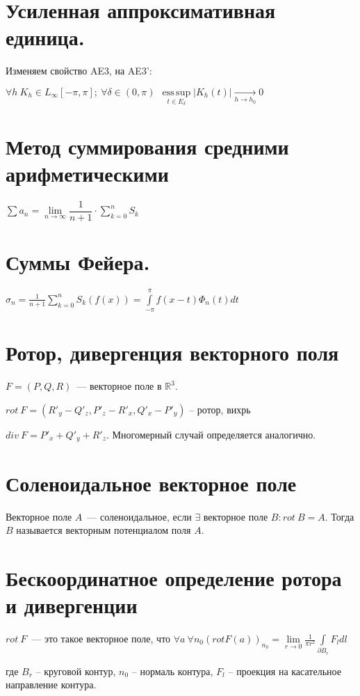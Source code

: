 \documentclass[paper=a4, fontsize=14pt]{report}
\DeclareMathOperator*{\esssup}{ess\, sup}
\begin{document}
    \section{Усиленная аппроксимативная единица.}
        
        Изменяем свойство AE3, на AE3': 
        
        $ \forall h ~ K_h \in L_\infty[-\pi, \pi]; ~ \forall \delta \in (0, \pi) ~ ~ \esssup\limits_{t \in E_\delta} |K_h(t)| \underset{h \rightarrow h_0}{\rightarrow} 0 $
        
    \section{Метод суммирования средними арифметическими}
        $\sum a_n = \lim\limits_{n \to \infty} \dfrac{1}{n+1} \cdot \sum\limits_{k=0}^n S_k$
    \section{Суммы Фейера.}
        $ \sigma_n = \frac{1}{n + 1} \sum\limits_{k=0}^{n} S_k(f(x)) = \int\limits_{-\pi}^{\pi} f(x - t) \Phi_n(t) dt$

	\section{Ротор, дивергенция векторного поля}
    $F = (P, Q, R)$~--- векторное поле в $\mathds{R}^3$.

	$ rot\ F = (R'_y - Q'_z, P'_z - R'_x, Q'_x - P'_y) $ -- ротор, вихрь

	$div\ F = P'_x + Q'_y + R'_z$. Многомерный случай определяется аналогично.

	\section{Соленоидальное векторное поле}
	Векторное поле $A$~--- соленоидальное, если $\exists$ векторное поле $B: rot\ B = A$. Тогда $B$ называется векторным потенциалом поля $A$.

	\section{Бескоординатное определение ротора и дивергенции}
	$rot\ F$~--- это такое векторное поле, что $\forall a \ \forall n_0 (rot F(a))_{n_0} = \lim\limits_{r\to 0} \frac{1}{\pi r^2} \int\limits_{\partial B_r} F_ldl$
		
	где $ B_r $ -- круговой контур, $ n_0 $ -- нормаль контура, $ F_l $ -- проекция на касательное направление контура. 
\end{document}
